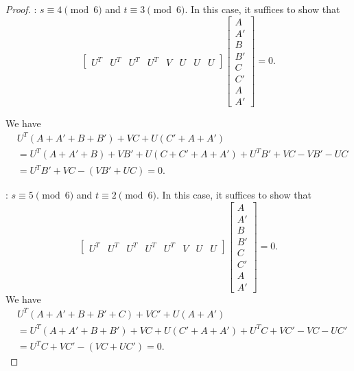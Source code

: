 \documentclass[10pt,a4paper]{amsart}
\newcommand{\A}{\mathbb{A}}
\DeclareMathOperator{\C}{\mathbb{C}}
\begin{document}
\begin{proof}
\medskip
{}: $s\equiv 4\pmod 6$ and $t\equiv 3\pmod 6$. In this case, it suffices to show that \[\begin{bmatrix}
    U^T & U^T & U^T & U^T&V & U & U & U 
\end{bmatrix} \begin{bmatrix}
    A\\A'\\B\\B'\\C\\C'\\A\\A'
\end{bmatrix}=0.\]

We have 
\[
\begin{aligned}
&U^T(A+A'+B+B') + VC+U(C'+A+A')\\
&=U^T(A+A'+B) + VB'+U(C+C'+A+A') +U^TB'+VC -VB' -UC \\
&=U^TB'+VC  -(VB' +UC)=0.
\end{aligned}
\]


\medskip
{}: $s\equiv 5\pmod 6$ and $t\equiv 2\pmod 6$. In this case, it suffices to show that \[\begin{bmatrix}
    U^T & U^T & U^T &U^T &U^T & V & U & U 
\end{bmatrix} \begin{bmatrix}
    A\\A'\\B\\B'\\C\\C'\\A\\A'
\end{bmatrix}=0.\]
We have 
\[
\begin{aligned}
&U^T(A+A'+B+B'+C) + VC'+U(A+A')\\
&=U^T(A+A'+B+B') + VC+U(C'+A+A')+U^TC+VC' - VC -UC' \\
&=U^TC+VC'  -(VC +UC')=0.
\end{aligned}
\]

\end{proof}
\end{document}
